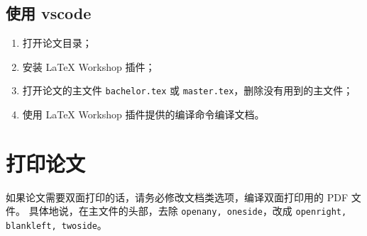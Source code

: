 \subsection{使用 vscode}
\begin{enumerate}
\item 打开论文目录；
\item 安装 LaTeX Workshop 插件；
\item 打开论文的主文件 \verb|bachelor.tex| 或 \verb|master.tex|，删除没有用到的主文件；
\item 使用 LaTeX Workshop 插件提供的编译命令编译文档。
\end{enumerate}

\section{打印论文}

如果论文需要双面打印的话，请务必修改文档类选项，编译双面打印用的 PDF 文件。
具体地说，在主文件的头部，去除 \texttt{openany, oneside}，改成 \texttt{openright, blankleft, twoside}。
